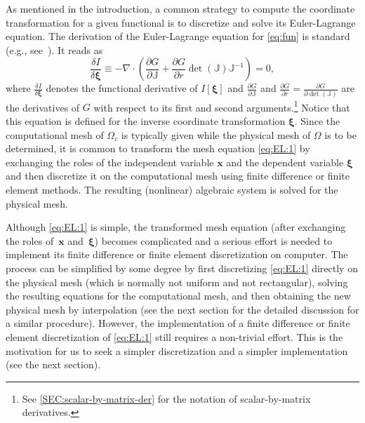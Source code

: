 \documentclass[american]{scrartcl}
\providecommand{\V}[1]{\boldsymbol{#1}}
\providecommand{\p}[2]{\frac{\partial{}#1}{\partial{}#2}}
\providecommand{\J}{\mathbb{J}}
\theoremstyle{remark}
\begin{document}
As mentioned in the introduction, a common strategy to compute the coordinate transformation for a given functional is to discretize and solve its Euler-Lagrange equation.
The derivation of the Euler-Lagrange equation for \cref{eq:fun} is standard (e.g., see~\cite[Chapter 6]{HR11}).
It reads as
\begin{equation}
   \frac{\delta I}{\delta \V{\xi}} 
      \equiv - \nabla \cdot \left( \p{G}{\J} + \p{G}{r} \det(\J) \J^{-1} \right)
      = 0
   ,
   \label{eq:EL:1}
\end{equation}
where $\frac{\delta I}{\delta \V{\xi}}$ denotes the functional derivative of $I[\V{\xi}]$ and $\p{G}{\J}$ and
$\p{G}{r} = \p{G}{\det(\J)}$ are the derivatives of $G$ with respect to its first and second arguments.\footnote{See \cref{SEC:scalar-by-matrix-der} for the notation of scalar-by-matrix derivatives.}
Notice that this equation is defined for the inverse coordinate transformation $\V{\xi}$.
Since the computational mesh of $\Omega_c$ is typically given while the physical mesh of $\Omega$ is to be determined, it is common to transform the mesh equation \cref{eq:EL:1} by exchanging the roles of the independent variable $\V{x}$ and the dependent variable $\V{\xi}$ and then discretize it on the computational mesh using finite difference or finite element methods.
The resulting (nonlinear) algebraic system is solved for the physical mesh.

Although \cref{eq:EL:1} is simple, the transformed mesh equation (after exchanging the roles of~$\V{x}$ and~$\V{\xi}$) becomes complicated and a serious effort is needed to implement its finite difference or finite element discretization on computer.
The process can be simplified by some degree by first discretizing \cref{eq:EL:1} directly on the physical mesh (which is normally not uniform and not rectangular), solving the resulting equations for the computational mesh, and then obtaining the new physical mesh by interpolation (see the next section for the detailed discussion for a similar procedure). 
However, the implementation of a finite difference or finite element discretization of \cref{eq:EL:1} still requires a non-trivial effort.
This is the motivation for us to seek a simpler discretization and a simpler implementation (see the next section).
\end{document}
